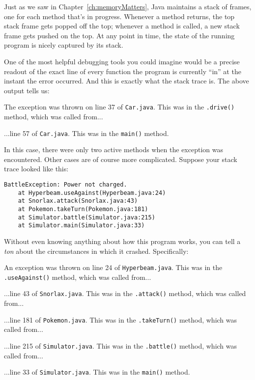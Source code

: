 Just as we saw in Chapter~\ref{ch:memoryMatters}, Java maintains a stack of
frames, one for each method that's in progress. Whenever a method returns, the
top stack frame gets popped off the top; whenever a method is called, a new
stack frame gets pushed on the top. At any point in time, the state of the
running program is nicely captured by its stack. 

One of the most helpful debugging tools you could imagine would be a precise
readout of the exact line of every function the program is currently ``in'' at
the instant the error occurred. And this is exactly what the stack trace is.
The above output tells us:

\begin{compactenum}
\item The exception was thrown on line 37 of \texttt{Car.java}. This was in
the \texttt{.drive()} method, which was called from...
\item ...line 57 of \texttt{Car.java}. This was in the \texttt{main()} method.
\end{compactenum}

In this case, there were only two active methods when the exception was
encountered. Other cases are of course more complicated. Suppose your stack
trace looked like this:

\begin{Verbatim}[fontsize=\small,samepage=true,frame=none]
BattleException: Power not charged.
    at Hyperbeam.useAgainst(Hyperbeam.java:24)
    at Snorlax.attack(Snorlax.java:43)
    at Pokemon.takeTurn(Pokemon.java:181)
    at Simulator.battle(Simulator.java:215)
    at Simulator.main(Simulator.java:33)
\end{Verbatim}

Without even knowing anything about how this program works, you can tell a
\textit{ton} about the circumstances in which it crashed. Specifically:

\begin{compactenum}

\item An exception was thrown on line 24 of \texttt{Hyperbeam.java}. This was
in the \texttt{.useAgainst()} method, which was called from...

\item ...line 43 of \texttt{Snorlax.java}. This was in the \texttt{.attack()}
method, which was called from...

\item ...line 181 of \texttt{Pokemon.java}. This was in the
\texttt{.takeTurn()} method, which was called from...

\item ...line 215 of \texttt{Simulator.java}. This was in the
\texttt{.battle()} method, which was called from...

\item ...line 33 of \texttt{Simulator.java}. This was in the \texttt{main()}
method.

\end{compactenum}

